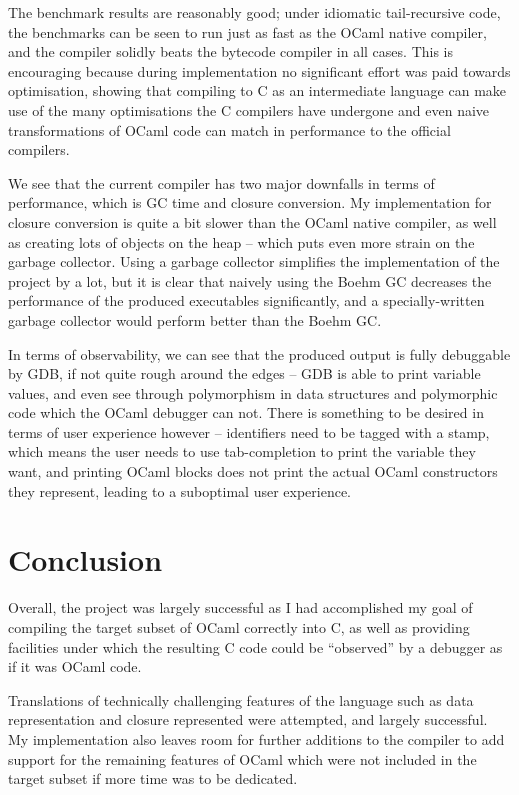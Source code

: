 The benchmark results are reasonably good; under idiomatic tail-recursive code,
the benchmarks can be seen to run just as fast as the OCaml native compiler, and
the compiler solidly beats the bytecode compiler in all cases. This is
encouraging because during implementation no significant effort was paid towards
optimisation, showing that compiling to C as an intermediate language can make
use of the many optimisations the C compilers have undergone and even naive
transformations of OCaml code can match in performance to the official
compilers.

We see that the current compiler has two major downfalls in terms of
performance, which is GC time and closure conversion. My implementation for
closure conversion is quite a bit slower than the OCaml native compiler, as well
as creating lots of objects on the heap -- which puts even more strain on the
garbage collector. Using a garbage collector simplifies the implementation of
the project by a lot, but it is clear that naively using the Boehm GC decreases
the performance of the produced executables significantly, and a
specially-written garbage collector would perform better than the Boehm GC.

In terms of observability, we can see that the produced output is fully
debuggable by GDB, if not quite rough around the edges -- GDB is able to print
variable values, and even see through polymorphism in data structures and
polymorphic code which the OCaml debugger can not. There is something to be
desired in terms of user experience however -- identifiers need to be tagged
with a stamp, which means the user needs to use tab-completion to print the
variable they want, and printing OCaml blocks does not print the actual OCaml
constructors they represent, leading to a suboptimal user experience.
    
\chapter{Conclusion}

Overall, the project was largely successful as I had accomplished my goal of 
compiling the target subset of OCaml correctly into C, as well as providing 
facilities under which the resulting C code could be ``observed'' by a debugger 
as if it was OCaml code.

Translations of technically challenging features of the language such as data
representation and closure represented were attempted, and largely successful.
My implementation also leaves room for further additions to the compiler to add
support for the remaining features of OCaml which were not included in the
target subset if more time was to be dedicated.

